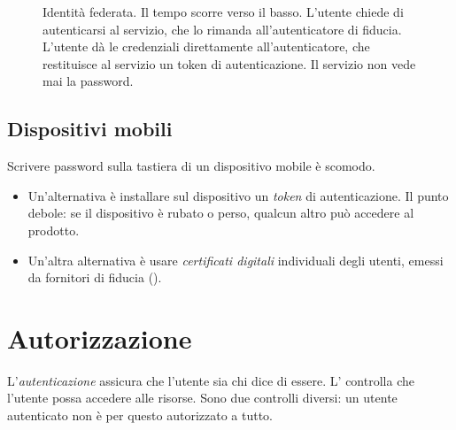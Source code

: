 \begin{figure}[ht]
\centering
{}
\caption{Identità federata. Il tempo scorre verso il basso. L'utente chiede di autenticarsi al servizio, che lo
rimanda all'autenticatore di fiducia. L'utente dà le credenziali direttamente all'autenticatore, che restituisce al
servizio un token di autenticazione. Il servizio non vede mai la password.}
\label{fig:sic-federata}
\end{figure}

\subsection{Dispositivi mobili}

Scrivere password sulla tastiera di un dispositivo mobile è scomodo.
\begin{itemize}
  \item Un'alternativa è installare sul dispositivo un \emph{token} di autenticazione. Il punto debole: se il
    dispositivo è rubato o perso, qualcun altro può accedere al prodotto.
  \item Un'altra alternativa è usare \emph{certificati digitali} individuali degli utenti, emessi da fornitori di
    fiducia ().
\end{itemize}

\section{Autorizzazione}
\label{sec:sic-autorizzazione}

\begin{attenzione}
L'\emph{autenticazione} assicura che l'utente sia chi dice di essere. L' controlla che
l'utente possa accedere alle risorse. Sono due controlli diversi: un utente autenticato non è per questo autorizzato a
tutto.
\end{attenzione}

